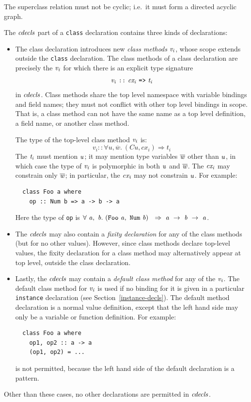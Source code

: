The superclass relation must not be cyclic; i.e.~it must form a
directed acyclic graph.

The \mbox{$\it cdecls$} part of a \mbox{\tt class} declaration contains three kinds
of declarations:
\begin{itemize}
\item
The class declaration introduces new {\em class methods}
\mbox{$\it v_i$}, whose scope extends outside the \mbox{\tt class} declaration.
The class methods of a class declaration are precisely the \mbox{$\it v_i$} for
which there is an explicit type signature
\[
\mbox{$\it v_i\ \makebox{\tt ::}\ cx_i\ \makebox{\tt =>}\ t_i$}
\]
in \mbox{$\it cdecls$}.  
Class methods share the top level namespace with variable
bindings and field names; they must not conflict with other top level
bindings in scope. 
That is, a class method can 
not have the same name as a top level definition, a field name, or
another class method.

The type of the top-level class method \mbox{$\it v_i$} is:
\[
v_i :: \forall u,\overline{w}.~(C u, cx_i) \Rightarrow t_i
\]
The \mbox{$\it t_i$} must mention \mbox{$\it u$}; it may mention type variables
\mbox{$\it \overline{w}$} other than \mbox{$\it u$}, in which case the type of \mbox{$\it v_i$} is
polymorphic in both \mbox{$\it u$} and \mbox{$\it \overline{w}\/$}.
The \mbox{$\it cx_i$} may constrain only \mbox{$\it \overline{w}$}; in particular,
the \mbox{$\it cx_i$} may not constrain \mbox{$\it u$}.
For example:
\bprog
{\small\begin{verbatim}
  class Foo a where
    op :: Num b => a -> b -> a
\end{verbatim}}
\eprog
Here the type of \mbox{\tt op} is
\mbox{$\it \forall\ a,\ b.~(\makebox{\tt Foo}~a,~\makebox{\tt Num}~b)~\ \Rightarrow\ a\ \rightarrow\ b\ \rightarrow\ a$}.

\item
The \mbox{$\it cdecls$} may also contain a {\em fixity declaration} for any of the class methods 
(but for no other values).
However, since class methods declare top-level values, the fixity declaration for a class
method may alternatively appear at top level, outside the class declaration.

\item
Lastly, the \mbox{$\it cdecls$} may contain a
{\em default class method}
for any of the \mbox{$\it v_i$}.  The default class method for \mbox{$\it v_i$} is used if no binding for it
is given in a particular \mbox{\tt instance} declaration (see
Section~\ref{instance-decls}).
The default method declaration is a normal value definition, except that the
left hand side may only be a variable or function definition.  For example:
\bprog
{\small\begin{verbatim}
  class Foo a where
    op1, op2 :: a -> a
    (op1, op2) = ...
\end{verbatim}}
\eprog
is not permitted, because the left hand side of the default declaration is a
pattern.
\end{itemize}
Other than these cases, no other declarations are permitted in \mbox{$\it cdecls$}.

